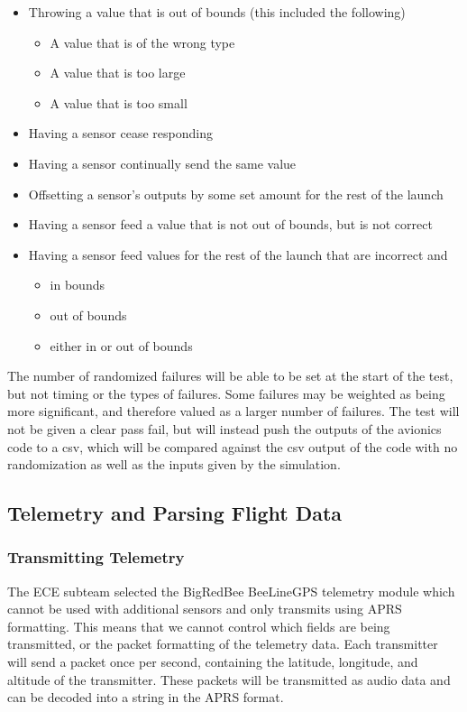 \documentclass[onecolumn, draftclsnofoot, 10pt, compsoc]{IEEEtran}
\begin{document}
\begin{itemize}
\item Throwing a value that is out of bounds (this included the following)
\begin{itemize}
\item A value that is of the wrong type
\item A value that is too large
\item A value that is too small
\end{itemize}
\item Having a sensor cease responding
\item Having a sensor continually send the same value
\item Offsetting a sensor’s outputs by some set amount for the rest of the launch
\item Having a sensor feed a value that is not out of bounds, but is not correct
\item Having a sensor feed values for the rest of the launch that are incorrect and
\begin{itemize}
\item in bounds 
\item out of bounds
\item either in or out of bounds
\end{itemize}
\end{itemize}

The number of randomized failures will be able to be set at the start of the test, but not timing or the types of failures. Some failures may be weighted as being more significant, and therefore valued as a larger number of failures. The test will not be given a clear pass fail, but will instead push the outputs of the avionics code to a csv, which will be compared against the csv output of the code with no randomization as well as the inputs given by the simulation.

\subsection{Telemetry and Parsing Flight Data}

\subsubsection{Transmitting Telemetry}

The ECE subteam selected the BigRedBee BeeLineGPS telemetry module which cannot be used with additional sensors and only transmits using APRS formatting.  This means that we cannot control which fields are being transmitted, or the packet formatting of the telemetry data.  Each transmitter will send a packet once per second, containing the latitude, longitude, and altitude of the transmitter.  These packets will be transmitted as audio data and can be decoded into a string in the APRS format.
\end{document}
